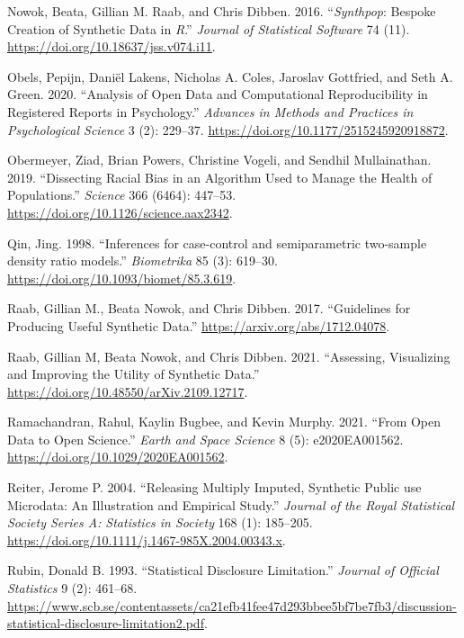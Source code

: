 \documentclass[
]{article}
\newlength{\cslhangindent}
\newenvironment{CSLReferences}[2] %
 {\begin{list}{}{%
  \setlength{\itemindent}{0pt}
  \setlength{\leftmargin}{0pt}
  \setlength{\parsep}{0pt}
  \ifodd #1
   \setlength{\leftmargin}{\cslhangindent}
   \setlength{\itemindent}{-1\cslhangindent}
  \fi
  \setlength{\itemsep}{#2\baselineskip}}}
 {\end{list}}
\begin{document}
\begin{CSLReferences}{1}{0}
Nowok, Beata, Gillian M. Raab, and Chris Dibben. 2016.
{``{\emph{Synthpop}:} Bespoke Creation of Synthetic Data in
{\emph{R}}.''} \emph{Journal of Statistical Software} 74 (11).
\url{https://doi.org/10.18637/jss.v074.i11}.

Obels, Pepijn, Daniël Lakens, Nicholas A. Coles, Jaroslav Gottfried, and
Seth A. Green. 2020. {``Analysis of Open Data and Computational
Reproducibility in Registered Reports in Psychology.''} \emph{Advances
in Methods and Practices in Psychological Science} 3 (2): 229--37.
\url{https://doi.org/10.1177/2515245920918872}.

Obermeyer, Ziad, Brian Powers, Christine Vogeli, and Sendhil
Mullainathan. 2019. {``Dissecting Racial Bias in an Algorithm Used to
Manage the Health of Populations.''} \emph{Science} 366 (6464): 447--53.
\url{https://doi.org/10.1126/science.aax2342}.

Qin, Jing. 1998. {``{Inferences for case-control and semiparametric
two-sample density ratio models}.''} \emph{Biometrika} 85 (3): 619--30.
\url{https://doi.org/10.1093/biomet/85.3.619}.

Raab, Gillian M., Beata Nowok, and Chris Dibben. 2017. {``Guidelines for
Producing Useful Synthetic Data.''}
\url{https://arxiv.org/abs/1712.04078}.

Raab, Gillian M, Beata Nowok, and Chris Dibben. 2021. {``Assessing,
Visualizing and Improving the Utility of Synthetic Data.''}
\url{https://doi.org/10.48550/arXiv.2109.12717}.

Ramachandran, Rahul, Kaylin Bugbee, and Kevin Murphy. 2021. {``From Open
Data to Open Science.''} \emph{Earth and Space Science} 8 (5):
e2020EA001562. \url{https://doi.org/10.1029/2020EA001562}.

Reiter, Jerome P. 2004. {``{Releasing Multiply Imputed, Synthetic Public
use Microdata: An Illustration and Empirical Study}.''} \emph{Journal of
the Royal Statistical Society Series A: Statistics in Society} 168 (1):
185--205. \url{https://doi.org/10.1111/j.1467-985X.2004.00343.x}.

Rubin, Donald B. 1993. {``Statistical Disclosure Limitation.''}
\emph{Journal of Official Statistics} 9 (2): 461--68.
\url{https://www.scb.se/contentassets/ca21efb41fee47d293bbee5bf7be7fb3/discussion-statistical-disclosure-limitation2.pdf}.


\end{CSLReferences}
\end{document}
